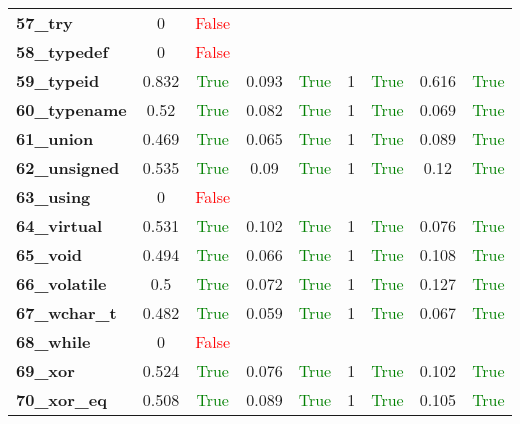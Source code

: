 \documentclass{article}
\begin{document}
\begin{xltabular}{\textwidth}{lcccccccc}
\textbf{57\_try}& 0&\textcolor{red}{False} \\[0.5ex]
\textbf{58\_typedef}& 0&\textcolor{red}{False} \\[0.5ex]
\textbf{59\_typeid}& 0.832&\textcolor{green}{True}& 0.093&\textcolor{green}{True}& 1&\textcolor{green}{True}& 0.616&\textcolor{green}{True} \\[0.5ex]
\textbf{60\_typename}& 0.52&\textcolor{green}{True}& 0.082&\textcolor{green}{True}& 1&\textcolor{green}{True}& 0.069&\textcolor{green}{True} \\[0.5ex]
\textbf{61\_union}& 0.469&\textcolor{green}{True}& 0.065&\textcolor{green}{True}& 1&\textcolor{green}{True}& 0.089&\textcolor{green}{True} \\[0.5ex]
\textbf{62\_unsigned}& 0.535&\textcolor{green}{True}& 0.09&\textcolor{green}{True}& 1&\textcolor{green}{True}& 0.12&\textcolor{green}{True} \\[0.5ex]
\textbf{63\_using}& 0&\textcolor{red}{False} \\[0.5ex]
\textbf{64\_virtual}& 0.531&\textcolor{green}{True}& 0.102&\textcolor{green}{True}& 1&\textcolor{green}{True}& 0.076&\textcolor{green}{True} \\[0.5ex]
\textbf{65\_void}& 0.494&\textcolor{green}{True}& 0.066&\textcolor{green}{True}& 1&\textcolor{green}{True}& 0.108&\textcolor{green}{True} \\[0.5ex]
\textbf{66\_volatile}& 0.5&\textcolor{green}{True}& 0.072&\textcolor{green}{True}& 1&\textcolor{green}{True}& 0.127&\textcolor{green}{True} \\[0.5ex]
\textbf{67\_wchar\_t}& 0.482&\textcolor{green}{True}& 0.059&\textcolor{green}{True}& 1&\textcolor{green}{True}& 0.067&\textcolor{green}{True} \\[0.5ex]
\textbf{68\_while}& 0&\textcolor{red}{False} \\[0.5ex]
\textbf{69\_xor}& 0.524&\textcolor{green}{True}& 0.076&\textcolor{green}{True}& 1&\textcolor{green}{True}& 0.102&\textcolor{green}{True} \\[0.5ex]
\textbf{70\_xor\_eq}& 0.508&\textcolor{green}{True}& 0.089&\textcolor{green}{True}& 1&\textcolor{green}{True}& 0.105&\textcolor{green}{True} \\[0.5ex]
\bottomrule
\end{xltabular}
\newpage
\end{document}

